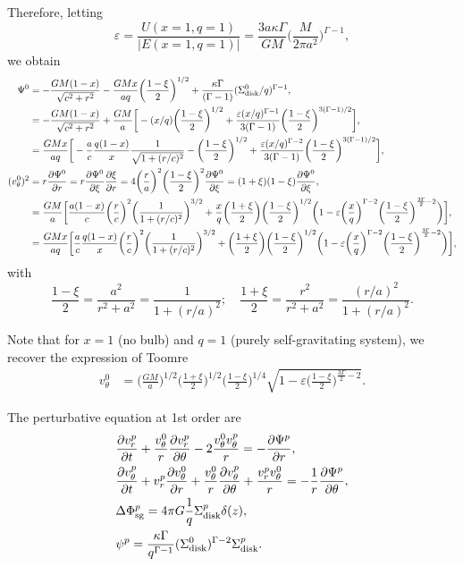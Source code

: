 \documentclass[11pt]{article}
\newcommand{\vr}{v_{r}}
\newcommand{\vt}{v_{\theta}}
\newcommand{\Sigmad}{\Sigma_{\rm{disk}}}
\newcommand{\Phisg}{\Phi_{\rm{sg}}}
\begin{document}
Therefore, letting  $$\varepsilon = \frac{U(x=1,q=1)}{|E(x=1,q=1)|} =\frac{3a \kappa \Gamma}{GM} \bigg(\frac{M}{2\pi a^2}\bigg)^{\Gamma-1},$$  we obtain
\begin{align*}
\Psi^0 &=  - \frac{G M (1-x)}{\sqrt{c^2+r^2}}-\frac{G M x}{a q}\bigg(\frac{1-\xi}{2}\bigg)^{1/2} + \frac{\kappa \Gamma}{(\Gamma-1)} (\Sigmad^0/q)^{\Gamma-1} ,\\
{}&=  -\frac{G M (1-x)}{\sqrt{c^2+r^2}}+\frac{G M }{a} \bigg[-(x/q)\bigg(\frac{1-\xi}{2}\bigg)^{1/2} + \frac{\varepsilon(x/q)^{\Gamma-1}}{3(\Gamma-1)}\bigg(\frac{1-\xi}{2}\bigg)^{3(\Gamma-1)/2} \bigg] ,\\
&=  \frac{G Mx}{aq}\bigg[-\frac{a}{c}\frac{q (1-x)}{x}\frac{1}{ \sqrt{1+(r/c)^2}} -\bigg(\frac{1-\xi}{2}\bigg)^{1/2} + \frac{\varepsilon(x/q)^{\Gamma-2}}{3(\Gamma-1)}\bigg(\frac{1-\xi}{2}\bigg)^{3(\Gamma-1)/2} \bigg],\\
(\vt^0)^2 &= r \frac{\partial \Psi^0}{\partial r} =r \frac{\partial \Psi^0}{\partial \xi} \frac{\partial \xi}
{\partial r} = 4\bigg(\frac{r}{a}\bigg)^2    \bigg(\frac{1-\xi}{2}\bigg)^2 \frac{\partial \Psi^0}{\partial \xi}= (1+\xi) (1-\xi) \frac{\partial \Psi^0}{\partial \xi}  ,\\
&=\frac{GM}{a}\bigg[\frac{a(1-x)}{c}\bigg( \frac{r}{c}\bigg)^2 \bigg(\frac{1}{1+(r/c)^2}\bigg)^{3/2} 
+ \frac{x}{q}\bigg(\frac{1+\xi}{2}\bigg) \bigg(\frac{1-\xi}{2}\bigg)^{1/2}  \bigg(1- \varepsilon\bigg(\frac{x}{q}\bigg)^{\Gamma-2}\bigg(\frac{1-\xi}{2}\bigg)^{\frac{3\Gamma}{2}-2} \bigg) \bigg], \\
&=\frac{GMx}{aq}\bigg[\frac{a}{c}\frac{q(1-x)}{x}\bigg( \frac{r}{c}\bigg)^2 \bigg(\frac{1}{1+(r/c)^2}\bigg)^{3/2} 
+ \bigg(\frac{1+\xi}{2}\bigg) \bigg(\frac{1-\xi}{2}\bigg)^{1/2}  \bigg(1- \varepsilon\bigg(\frac{x}{q}\bigg)^{\Gamma-2}\bigg(\frac{1-\xi}{2}\bigg)^{\frac{3\Gamma}{2}-2} \bigg) \bigg],
\end{align*}
with
$$\frac{1-\xi}{2}= \frac{a^2}{r^2+a^2}= \frac{1}{1+(r/a)^2}; \quad \frac{1+\xi}{2}= \frac{r^2}{r^2+a^2}= \frac{(r/a)^2}{1+(r/a)^2}.$$

Note that for $x=1$ (no bulb) and $q=1$ (purely self-gravitating system), we recover the expression of Toomre
\begin{align*}
\vt^0 &=\bigg(\frac{GM}{a} \bigg)^{1/2}\bigg(\frac{1+\xi}{2}\bigg)^{1/2} \bigg(\frac{1-\xi}{2}\bigg)^{1/4}  \sqrt{1- \varepsilon \bigg(\frac{1-\xi}{2}\bigg)^{\frac{3\Gamma}{2}-2}} .
\end{align*}

The perturbative equation at 1st order are
\begin{align*}
&\frac{\partial \vr^p}{\partial t} + \frac{\vt^0}{r} \frac{\partial \vr^p}{\partial \theta} - 2\frac{\vt^0 \vt^p}{r} = -\frac{\partial \Psi^p}{\partial r} ,\\
&\frac{\partial \vt^p}{\partial t} + \vr^p \frac{\partial \vt^0}{\partial r} + \frac{\vt^0}{r} \frac{\partial \vt^p}{\partial \theta} + \frac{\vr^p\vt^0}{r} = -\frac{1}{r}\frac{\partial \Psi^p}{\partial \theta} ,\\
& \Delta \Phisg^p = 4\pi G \frac{1}{q} \Sigmad^p \delta (z), \\
& \psi^p =  \frac{\kappa \Gamma}{q^{\Gamma-1}} (\Sigmad^0)^{\Gamma-2} \Sigmad^p .
\end{align*}
\end{document}
